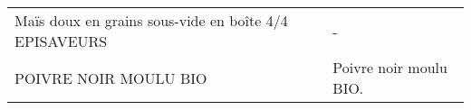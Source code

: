 \begin{longtable}{p{5cm}p{10cm}}
                                                    Maïs doux en grains sous-vide en boîte 4/4 EPISAVEURS &                                                                                                                                                                                                                                                                                                                                                                                                                                                                                                                                                                                                                                                                                                                                                                                                                                                                                                                                                                                                                                        - \\
                                                                                    POIVRE NOIR MOULU BIO &                                                                                                                                                                                                                                                                                                                                                                                                                                                                                                                                                                                                                                                                                                                                                                                                                                                                                                                                                                                                                   Poivre noir moulu BIO. \\

\end{longtable}
